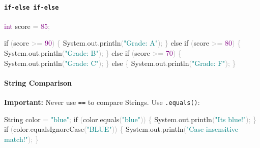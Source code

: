 \documentclass[
  justified,
  openright,
]{tufte-book}
\let\subsubsection\paragraph
\let\paragraph\paragraph
\newcommand{\BuiltInTok}[1]{#1}
\newcommand{\ControlFlowTok}[1]{\textcolor{BrandBlue}{#1}}
\newcommand{\DataTypeTok}[1]{\textcolor{Purple}{#1}}
\newcommand{\DecValTok}[1]{\textcolor{Purple}{#1}}
\newcommand{\FunctionTok}[1]{\textcolor{BrandBlue}{#1}}
\newcommand{\NormalTok}[1]{#1}
\newcommand{\OperatorTok}[1]{\textcolor{DarkGray}{#1}}
\newcommand{\StringTok}[1]{\textcolor{Teal}{#1}}
\newenvironment{Shaded}{%
  \begin{snugshade}
}{%
  \end{snugshade}
}
\let\subsubsection\paragraph
\let\paragraph\paragraph
\begin{document}
\subsubsection{\texorpdfstring{\texttt{if-else\ if-else}}{if-else if-else}}\label{if-else-if-else}

\begin{Shaded}
\begin{Highlighting}[]
\DataTypeTok{int}\NormalTok{ score }\OperatorTok{=} \DecValTok{85}\OperatorTok{;}

\ControlFlowTok{if} \OperatorTok{(}\NormalTok{score }\OperatorTok{\textgreater{}=} \DecValTok{90}\OperatorTok{)} \OperatorTok{\{}
    \BuiltInTok{System}\OperatorTok{.}\FunctionTok{out}\OperatorTok{.}\FunctionTok{println}\OperatorTok{(}\StringTok{"Grade: A"}\OperatorTok{);}
\OperatorTok{\}} \ControlFlowTok{else} \ControlFlowTok{if} \OperatorTok{(}\NormalTok{score }\OperatorTok{\textgreater{}=} \DecValTok{80}\OperatorTok{)} \OperatorTok{\{}
    \BuiltInTok{System}\OperatorTok{.}\FunctionTok{out}\OperatorTok{.}\FunctionTok{println}\OperatorTok{(}\StringTok{"Grade: B"}\OperatorTok{);}
\OperatorTok{\}} \ControlFlowTok{else} \ControlFlowTok{if} \OperatorTok{(}\NormalTok{score }\OperatorTok{\textgreater{}=} \DecValTok{70}\OperatorTok{)} \OperatorTok{\{}
    \BuiltInTok{System}\OperatorTok{.}\FunctionTok{out}\OperatorTok{.}\FunctionTok{println}\OperatorTok{(}\StringTok{"Grade: C"}\OperatorTok{);}
\OperatorTok{\}} \ControlFlowTok{else} \OperatorTok{\{}
    \BuiltInTok{System}\OperatorTok{.}\FunctionTok{out}\OperatorTok{.}\FunctionTok{println}\OperatorTok{(}\StringTok{"Grade: F"}\OperatorTok{);}
\OperatorTok{\}}
\end{Highlighting}
\end{Shaded}

\subsubsection{String Comparison}\label{string-comparison}

\textbf{Important:} Never use \texttt{==} to compare Strings. Use
\texttt{.equals()}:

\begin{Shaded}
\begin{Highlighting}[]
\BuiltInTok{String}\NormalTok{ color }\OperatorTok{=} \StringTok{"blue"}\OperatorTok{;}
\ControlFlowTok{if} \OperatorTok{(}\NormalTok{color}\OperatorTok{.}\FunctionTok{equals}\OperatorTok{(}\StringTok{"blue"}\OperatorTok{))} \OperatorTok{\{}
    \BuiltInTok{System}\OperatorTok{.}\FunctionTok{out}\OperatorTok{.}\FunctionTok{println}\OperatorTok{(}\StringTok{"It\textquotesingle{}s blue!"}\OperatorTok{);}
\OperatorTok{\}}
\ControlFlowTok{if} \OperatorTok{(}\NormalTok{color}\OperatorTok{.}\FunctionTok{equalsIgnoreCase}\OperatorTok{(}\StringTok{"BLUE"}\OperatorTok{))} \OperatorTok{\{}
    \BuiltInTok{System}\OperatorTok{.}\FunctionTok{out}\OperatorTok{.}\FunctionTok{println}\OperatorTok{(}\StringTok{"Case{-}insensitive match!"}\OperatorTok{);}
\OperatorTok{\}}
\end{Highlighting}
\end{Shaded}
\end{document}
